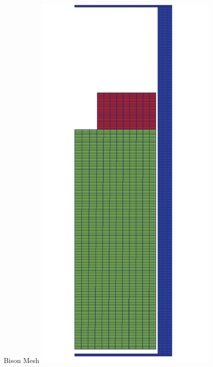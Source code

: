 \begin{frame}
\begin{columns}
\begin{column}{0.7\textwidth}
 \end{column}
 \begin{column}{0.3\textwidth}
  \centering
  Bison Mesh
  \includegraphics[width=1.\textwidth]{./riso_an3_mesh.png}
 \end{column}
\end{columns}

\end{frame}
